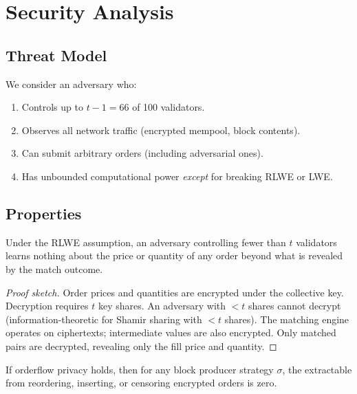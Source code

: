 \section{Security Analysis}

\label{sec:security}

\subsection{Threat Model}

We consider an adversary who:
\begin{enumerate}
    \item Controls up to $t - 1 = 66$ of 100 \TChain{} validators.
    \item Observes all network traffic (encrypted mempool, block contents).
    \item Can submit arbitrary orders (including adversarial ones).
    \item Has unbounded computational power \emph{except} for breaking \textsc{RLWE} or \textsc{LWE}.
\end{enumerate}

\subsection{Properties}

\begin{theorem}
Under the \textsc{RLWE} assumption, an adversary controlling fewer than $t$ validators learns nothing about the price or quantity of any order beyond what is revealed by the match outcome.
\end{theorem}

\begin{proof}[Proof sketch]
Order prices and quantities are encrypted under the collective \FHE{} key. Decryption requires $t$ key shares. An adversary with $< t$ shares cannot decrypt (information-theoretic for Shamir sharing with $< t$ shares). The matching engine operates on ciphertexts; intermediate values are also encrypted. Only matched pairs are decrypted, revealing only the fill price and quantity.
\end{proof}

\begin{theorem}
If orderflow privacy holds, then for any block producer strategy $\sigma$, the \MEV{} extractable from reordering, inserting, or censoring encrypted orders is zero.
\end{theorem}

